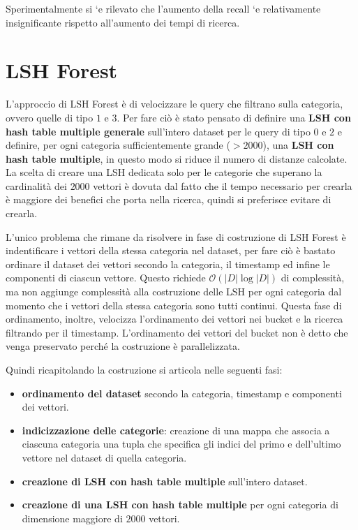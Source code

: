 Sperimentalmente si `e rilevato che l’aumento della recall `e relativamente insignificante rispetto all'aumento dei tempi di ricerca.

\section{LSH Forest}
L'approccio di LSH Forest è di velocizzare le query che filtrano sulla categoria,
ovvero quelle di tipo $1$ e $3$. Per fare ciò è stato pensato di definire una \textbf{LSH
con hash table multiple generale} sull'intero dataset per le query di tipo $0$ e $2$ e definire,
per ogni categoria sufficientemente grande ($>2000$), una \textbf{LSH con hash table multiple}, in questo 
modo si riduce il numero di distanze calcolate. La scelta di creare 
una LSH dedicata solo per le categorie che superano la cardinalità dei $2000$ vettori 
è dovuta dal fatto che il tempo necessario per crearla è maggiore dei benefici 
che porta nella ricerca, quindi si preferisce evitare di crearla.

L'unico problema che rimane da risolvere in fase di costruzione di LSH Forest è 
indentificare i vettori della stessa categoria nel dataset, per fare ciò è bastato 
ordinare il dataset dei vettori secondo la categoria, il timestamp ed infine 
le componenti di ciascun vettore. Questo richiede $\mathcal{O}(|D|\log |D|)$ di 
complessità, ma non aggiunge complessità alla costruzione delle LSH per ogni categoria 
dal momento che i vettori della stessa categoria sono tutti continui. Questa 
fase di ordinamento, inoltre, velocizza l'ordinamento dei vettori nei bucket e la ricerca 
filtrando per il timestamp. L'ordinamento dei vettori del bucket non è detto 
che venga preservato perché la costruzione è parallelizzata.

Quindi ricapitolando la costruzione si articola nelle seguenti fasi:
\begin{itemize}
    \item \textbf{ordinamento del dataset} secondo la categoria, timestamp e componenti dei vettori.
    \item \textbf{indicizzazione delle categorie}: creazione di una mappa che 
    associa a ciascuna categoria una tupla che specifica gli indici 
    del primo e dell'ultimo vettore nel dataset di quella categoria.
    \item \textbf{creazione di LSH con hash table multiple} sull'intero dataset.
    \item \textbf{creazione di una LSH con hash table multiple} per ogni categoria 
    di dimensione maggiore di $2000$ vettori.
\end{itemize}

